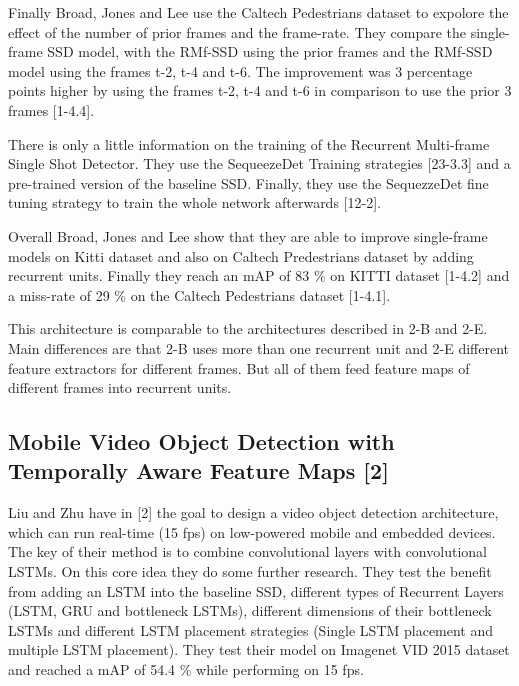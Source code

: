 \documentclass[conference]{IEEEtran}
\begin{document}
Finally Broad, Jones and Lee use the Caltech Pedestrians dataset to expolore the effect of the number of prior frames and the frame-rate. They compare the single-frame SSD model, with the RMf-SSD using the prior frames and the RMf-SSD model using the frames t-2, t-4 and t-6. The improvement was 3 percentage points higher by using the frames t-2, t-4 and t-6 in comparison to use the prior 3 frames [1-4.4]. \newline  

There is only a little information on the training of the Recurrent Multi-frame Single Shot Detector. They use the SequeezeDet Training strategies [23-3.3] and a pre-trained version of the baseline SSD. Finally, they use the SequezzeDet fine tuning strategy to train the whole network afterwards [12-2]. \newline

Overall Broad, Jones and Lee show that they are able to improve single-frame models on Kitti dataset and also on Caltech Predestrians dataset by adding recurrent units. Finally they reach an mAP of 83 \% on KITTI dataset [1-4.2] and a miss-rate of 29 \% on the Caltech Pedestrians dataset [1-4.1]. \newline

This architecture is comparable to the architectures described in 2-B and 2-E. Main differences are that 2-B uses more than one recurrent unit and 2-E different feature extractors for different frames. But all of them feed feature maps of different frames into recurrent units. 
 
\subsection{Mobile Video Object Detection with Temporally Aware Feature Maps [2]}
Liu and Zhu have in [2] the goal to design a video object detection architecture, which can run real-time (15 fps) on low-powered mobile and embedded devices. The key of their method is to combine convolutional layers with convolutional LSTMs. On this core idea they do some further research. They test the benefit from adding an LSTM into the baseline SSD, different types of Recurrent Layers (LSTM, GRU and bottleneck LSTMs), different dimensions of their bottleneck LSTMs and different LSTM placement strategies (Single LSTM placement and multiple LSTM placement). They test their model on Imagenet VID 2015 dataset and reached a mAP of 54.4 \% while performing on 15 fps.  \newline
\end{document}
